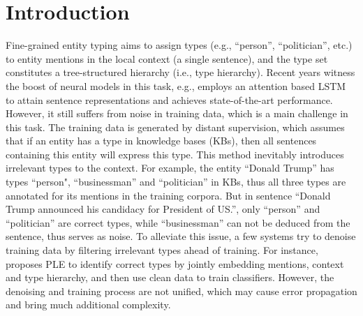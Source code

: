\documentclass[letterpaper]{article} %
\begin{document}
\section{Introduction}
\noindent Fine-grained entity typing aims to assign types (e.g., ``person'', ``politician'', etc.) %
to entity mentions in the local context (a single sentence), and the type set constitutes a tree-structured hierarchy (i.e., type hierarchy). %
Recent years witness the boost of neural models in this task, e.g., \cite{Shimaoka2016Neural} employs an attention based LSTM to attain sentence representations and achieves state-of-the-art performance. However, it still suffers from noise in training data,  which is a main challenge in this task. %
The training data is generated by distant supervision, which assumes that if an entity has a type in knowledge bases (KBs), then all sentences containing this entity will express this type. %
This method inevitably introduces irrelevant types to the context.
For example, the entity ``Donald Trump'' has types ``person", ``businessman'' and ``politician'' in KBs, thus all three types are annotated for its mentions in the training corpora. But in sentence ``Donald Trump announced his candidacy for President of US.'', only ``person'' and ``politician'' are correct types, %
while ``businessman'' can not be deduced from the sentence, thus serves as noise.
To alleviate this issue, a few systems try to denoise training data by filtering irrelevant types ahead of training. %
For instance, \cite{Ren2016Label} proposes PLE to  identify correct types by jointly embedding mentions, context and type hierarchy, and then use clean data to train classifiers. %
However, the denoising and training process are not unified, which may cause error propagation and bring much additional complexity.
\end{document}
